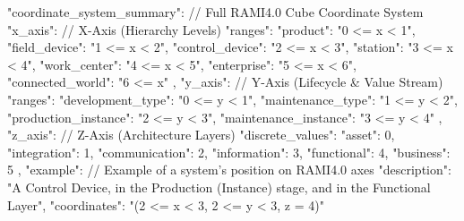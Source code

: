 {  "coordinate_system_summary": {  // Full RAMI4.0 Cube Coordinate System
    "x_axis": {  // X-Axis (Hierarchy Levels)
      "ranges": {
        "product": "0 <= x < 1",
        "field_device": "1 <= x < 2",
        "control_device": "2 <= x < 3",
        "station": "3 <= x < 4",
        "work_center": "4 <= x < 5",
        "enterprise": "5 <= x < 6",
        "connected_world": "6 <= x"
      }
    },
    "y_axis": {  // Y-Axis (Lifecycle & Value Stream)
      "ranges": {
        "development_type": "0 <= y < 1",
        "maintenance_type": "1 <= y < 2",
        "production_instance": "2 <= y < 3",
        "maintenance_instance": "3 <= y < 4"
      }
    },
    "z_axis": {  // Z-Axis (Architecture Layers)
      "discrete_values": {
        "asset": 0,
        "integration": 1,
        "communication": 2,
        "information": 3,
        "functional": 4,
        "business": 5
      }
    },
    "example": {  // Example of a system's position on RAMI4.0 axes
      "description": "A Control Device, in the Production (Instance) stage, and in the Functional Layer",
      "coordinates": "(2 <= x < 3, 2 <= y < 3, z = 4)"
    }
  }
}